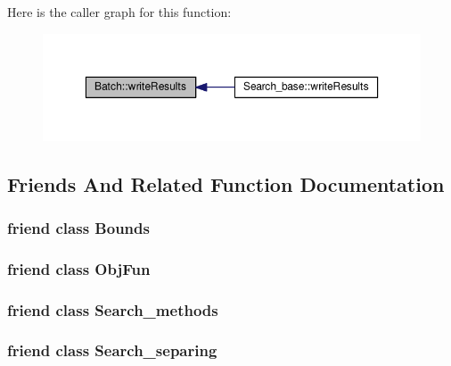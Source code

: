 Here is the caller graph for this function\-:\nopagebreak
\begin{figure}[H]
\begin{center}
\leavevmode
\includegraphics[width=350pt]{classBatch_a4c6c23dd95eccc220115af294d481219_icgraph}
\end{center}
\end{figure}




\subsection{Friends And Related Function Documentation}
\hypertarget{classBatch_ac174a08cdaebb01dfd90673034f10fab}{
\subsubsection[{Bounds}]{\setlength{\rightskip}{0pt plus 5cm}friend class {\bf Bounds}\hspace{0.3cm}{\ttfamily [friend]}}}\label{classBatch_ac174a08cdaebb01dfd90673034f10fab}
\hypertarget{classBatch_ab332b708060d79472caf1a215fe8b6a9}{
\subsubsection[{Obj\-Fun}]{\setlength{\rightskip}{0pt plus 5cm}friend class {\bf Obj\-Fun}\hspace{0.3cm}{\ttfamily [friend]}}}\label{classBatch_ab332b708060d79472caf1a215fe8b6a9}
\hypertarget{classBatch_a03f712db503340b39afba2ca88462f1d}{
\subsubsection[{Search\-\_\-methods}]{\setlength{\rightskip}{0pt plus 5cm}friend class {\bf Search\-\_\-methods}\hspace{0.3cm}{\ttfamily [friend]}}}\label{classBatch_a03f712db503340b39afba2ca88462f1d}
\hypertarget{classBatch_a48cd94dfe9e88346e3aaf70313022182}{
\subsubsection[{Search\-\_\-separing}]{\setlength{\rightskip}{0pt plus 5cm}friend class {\bf Search\-\_\-separing}\hspace{0.3cm}{\ttfamily [friend]}}}\label{classBatch_a48cd94dfe9e88346e3aaf70313022182}


